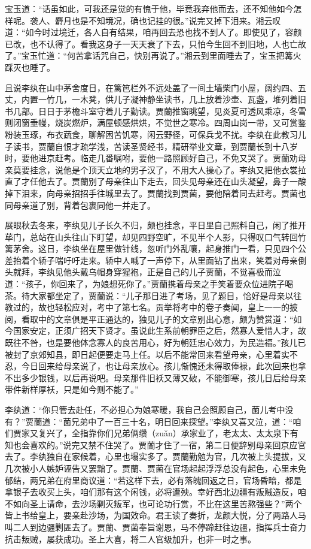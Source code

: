 \documentclass[12pt,oneside]{book}
\begin{document}
宝玉道：“话虽如此，可我还是觉的有愧于他，毕竟我弃他而去，还不知他如今怎样呢。袭人、麝月也是不知境况，确也记挂的很。”说完又掉下泪来。湘云叹道：“如今时过境迁，各人自有结果，咱再回去恐也找不到人了。即使见了，容颜已改，也不认得了。看我这身子一天天衰了下去，只怕今生回不到旧地，人也亡故了。”宝玉忙道：“何苦拿话咒自己，快别再说了。”湘云到里面睡去了，宝玉把篝火踩灭也睡了。

且说李纨在山中茅舍度日，在篱笆栏外不远处盖了一间土墙柴门小屋，阔约四、五丈，内置一竹几，一木凳，供儿子凝神静坐读书，几上放着沙壶、瓦盏，堆列着旧书几部。日日于茅檐斗室守着儿子勤读。贾蘭推窗眺望，见炎夏可透风乘凉，冬雪则闭窗垂幔，烧炭燃炉，满屋顿感烘烘，不觉世之寒冷。四周山岗一带，又可赏鉴粉装玉琢，布衣蔬食，聊解困苦饥寒，闲云野径，可保兵戈不扰。李纨在此教习儿子读书，贾蘭自恨才疏学浅，苦读圣贤经书，精研举业文章，到贾蘭长到十八岁时，要他进京赶考。临走几番嘱咐，要他一路照顾好自己，不免又哭了。贾蘭劝母亲莫要挂念，说他是个顶天立地的男子汉了，不用大人操心了。李纨又把他衣裳拉直了才任他去了。贾蘭别了母亲往山下走去，回头见母亲还在山头凝望，鼻子一酸掉下泪来，向母亲招招手往城里去了。贾蘭找到贾菌，要他陪着同去赶考。贾菌也同母亲道了别，背着包裹同他一并走了。

展眼秋去冬来，李纨见儿子长久不归，颇也挂念，平日里自己照料自己，闲了推开荜门，总站在山头往山下盯望，却见四野空旷，不见半个人影，只得叹口气转回竹篱茅舍。这日，李纨坐在屋里做针线，忽听门外乱嚷，起身推门一看，只见四个公差抬着个轿子喘吁吁走来。轿中人喊了一声停下，从里面钻了出来，笑着对母亲倒头就拜，李纨见他头戴乌帽身穿猩袍，正是自己的儿子贾蘭，不觉喜极而泣道：“孩子，你回来了，为娘想死你了。”贾蘭携着母亲之手笑着要众位进院子喝茶。待大家都坐定了，贾蘭说：“儿子那日进了考场，见了题目，恰好是母亲以往教过的，故也轻松应对，考中了第七名。贡举将考中的卷子奏闻，皇上一一的披阅，看取中的文章俱是平正通达的，独见儿子的文章别出心意，颇为赞赏道：“如今国家安定，正须广招天下贤才。虽说此生系前朝罪臣之后，然寡人爱惜人才，故既往不咎，也是要他体念寡人的良苦用心，好为朝廷忠心效力，为民造福。”孩儿已被封了京郊知县，即日起便要走马上任。以后不能常回来看望母亲，心里着实不忍，今日回来给母亲说了，也让母亲放心。孩儿惭愧还未得取俸禄，此次回来也拿不出多少银钱，以后再说吧。母亲那件旧袄又薄又破，不能御寒，孩儿日后给母亲带件新样厚袄，只是如今则不能了。”

李纨道：“你只管去赴任，不必担心为娘寒暖，我自己会照顾自己，菌儿考中没有？”贾蘭道：“菌兄弟中了一百三十名，明日回来探望。”李纨又喜又泣，道：“咱们贾家又复兴了，全指靠你们兄弟俩缵（zuǎn）承家业了，老太太、太太泉下有知也会喜欢的。”说完又禁不住哭了。贾蘭才住了一宿，第二日便辞别母亲回京应官去了。李纨独自在家候着，心里也塌实多了。贾蘭勤勉为官，几次被上头提拔，又几次被小人嫉妒诬告又罢黜了。贾蘭、贾菌在官场起起浮浮总没有起色，心里未免郁结，两兄弟在府里商议道：“若这样下去，必有落魄回返之日，官场昏暗，都是拿银子去收买上头，咱们那有这个闲钱，必将遭殃。幸好西北边疆有叛贼造反，咱不如向圣上请命，去沙场剿灭叛军，也可论功行赏，不比在这里苦熬强些？”两个皆上书给皇上，要亲赴沙场，为国效命。君王读了奏折，龙颜大悦，分了两路人马叫二人到边疆剿匪去了。贾蘭、贾菌奉旨谢恩，马不停蹄赶往边疆，指挥兵士奋力抗击叛贼，屡获成功。圣上大喜，将二人官级加升，也非一时之事。
\end{document}
